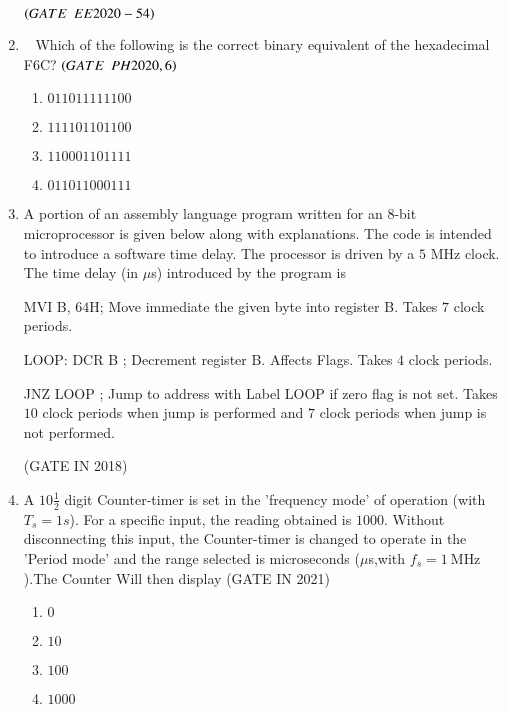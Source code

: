 \begin{enumerate}[label=\arabic*.,ref=\theenumi]
$\hfill\brak{GATE\enspace EE2020-54}$
\item  Which of the following is the correct binary equivalent of the hexadecimal F6C?
$\hfill\brak{GATE\enspace PH2020,6}$

\begin{enumerate}
  \item  $0110 1111 1100$
  \item $1111 0110 1100$
  \item $1100 0110 1111$
  \item $0110 1100 0111$

\end{enumerate}
\item
\label{prob:gate IN 45}
 A portion of an assembly language program written for an $8$-bit microprocessor is given below along with explanations. The code is intended to introduce a software time delay. The processor is driven by a $5$ MHz clock. The time delay (in $\mu$s) introduced by the program is \vspace{12 pt}


MVI B, $64$H; Move immediate the given byte into register B. Takes $7$ clock periods.\vspace{12 pt}


LOOP: DCR B ; Decrement register B. Affects Flags. Takes $4$ clock periods. \vspace{12 pt}


JNZ LOOP ; Jump to address with Label LOOP if zero flag is not set. Takes $10$ clock periods when jump is performed and $7$ clock periods when jump is not performed.

\hfill(GATE IN 2018)

\item A $10\frac{1}{2}$ digit Counter-timer is set in the 'frequency mode' of operation (with $T_s=1s$). For a specific input, the reading obtained is $1000$. Without disconnecting this input, the Counter-timer is changed to operate in the 'Period mode' and the range selected is microseconds ($\mu$s,with $f_s=\SI{1}{\mega\hertz}$).The Counter Will then display
\hfill(GATE IN 2021)
\begin{enumerate}
  \item $0$
  \item $10$
  \item $100$
  \item $1000$
\end{enumerate}


\end{enumerate}
